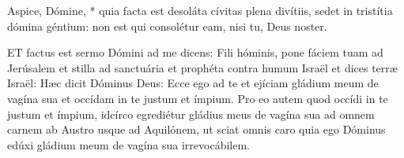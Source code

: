  Aspice, Dómine, * quia facta est desoláta cívitas plena divítiis, sedet in tristítia dómina géntium: non est qui consolétur eam, nisi tu, Deus noster.







\lettrine[lines=2]{E}{T} factus est sermo Dómini ad me dicens: Fili hóminis, pone fáciem tuam ad Jerúsalem et stilla ad sanctuária et prophéta contra humum Israël et dices terræ Israël: Hæc dicit Dóminus Deus: Ecce ego ad te et ejíciam gládium meum de vagína sua et occídam in te justum et ímpium. Pro eo autem quod occídi in te justum et ímpium, idcírco egrediétur gládius meus de vagína sua ad omnem carnem ab Austro usque ad Aquilónem, ut sciat omnis caro quia ego Dóminus edúxi gládium meum de vagína sua irrevocábilem.

